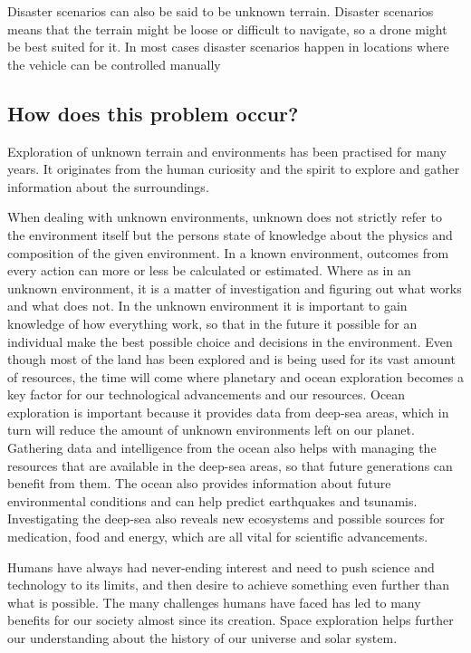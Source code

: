 Disaster scenarios can also be said to be unknown terrain. Disaster scenarios means that the terrain might be loose or difficult to navigate, so a drone might be best suited for it. In most cases disaster scenarios happen in locations where the vehicle can be controlled manually

\subsection{How does this problem occur?}

Exploration of unknown terrain and environments has been practised for many years. It originates from the human curiosity and the spirit to explore and gather information about the surroundings.

When dealing with unknown environments, unknown does not strictly refer to the environment itself but the persons state of knowledge about the physics and composition of the given environment. In a known environment, outcomes from every action can more or less be calculated or estimated. Where as in an unknown environment, it is a matter of investigation and figuring out what works and what does not. In the unknown environment it is important to gain knowledge of how everything work, so that in the future it possible for an individual make the best possible choice and decisions in the environment.\cite{aiint}
Even though most of the land has been explored and is being used for its vast amount of resources, the time will come where planetary and ocean exploration becomes a key factor for our technological advancements and our resources. Ocean exploration is important because it provides data from deep-sea areas, which in turn will reduce the amount of unknown environments left on our planet.
Gathering data and intelligence from the ocean also helps with managing the resources that are available in the deep-sea areas, so that future generations can benefit from them. The ocean also provides information about future environmental conditions and can help predict earthquakes and tsunamis. Investigating the deep-sea also reveals new ecosystems and possible sources for medication, food and energy, which are all vital for scientific advancements.\cite{oceanexplo}

Humans have always had never-ending interest and need to push science and technology to its limits, and then desire to achieve something even further than what is possible.  The many challenges humans have faced has led to many benefits for our society almost since its creation. Space exploration helps further our understanding about the history of our universe and solar system.\cite{whyweexplo}

